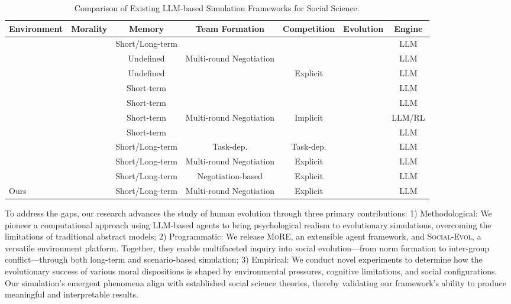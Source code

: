 \documentclass[letterpaper]{article} %
\newcommand{\cmark}{\ding{51}}  %
\newcommand{\xmark}{\ding{55}}  %
\newcommand{\agentframe}{\textsc{MoRE}\xspace}
\newcommand{\envframe}{\textsc{Social-Evol}\xspace}
\begin{document}
\begin{table}[t]
\setlength{\tabcolsep}{3pt}
\centering
\caption{Comparison of Existing LLM-based Simulation Frameworks for Social Science.}
\begin{tabularx}{\textwidth}{@{}p{4.5cm} c c c c c c@{}}
\toprule
\textbf{Environment} & \textbf{Morality} & \textbf{Memory} & \textbf{Team Formation} & \textbf{Competition} & \textbf{Evolution} & \textbf{Engine} \\
\midrule
\citet{park2023generative} & \xmark & Short/Long-term &  \xmark & \xmark & \xmark & LLM \\
\citet{li2023camel} & \xmark & Undefined & Multi-round Negotiation & \xmark & \xmark & LLM \\
\citet{horton2023large} & \xmark & Undefined & \xmark & Explicit & \xmark & LLM \\
\citet{aher2023using} & \xmark & Short-term & \xmark & \xmark & \xmark & LLM \\
\citet{wang2023humanoid} & \xmark & Short-term & \xmark & \xmark & \xmark & LLM \\
\citet{huang2024adasociety} & \xmark & Short-term & Multi-round Negotiation & Implicit & \cmark & LLM/RL \\
\citet{wang2024simulating} & \xmark & Short-term & \xmark & \xmark & \xmark & LLM \\
\citet{piao2025agentsociety} & \xmark &  Short/Long-term & Task-dep. & Task-dep. & \cmark & LLM \\
\citet{guan2024richelieu} & \xmark & Short/Long-term & Multi-round Negotiation & Explicit & \cmark & LLM \\
\citet{dai2024artificial} & \xmark & Short/Long-term & Negotiation-based & Explicit & \cmark & LLM \\
\midrule
Ours & \cmark & Short/Long-term & Multi-round Negotiation & Explicit & \cmark & LLM \\
\bottomrule
\end{tabularx}
\label{tab:comparison}
\end{table}

To address the gaps, our research advances the study of human evolution through three primary contributions:
1) Methodological: We pioneer a computational approach using LLM-based agents to bring psychological realism to evolutionary simulations, overcoming the limitations of traditional abstract models;
2) Programmatic: We release \agentframe, an extensible agent framework, and \envframe, a versatile environment platform. Together, they enable multifaceted inquiry into social evolution—from norm formation to inter-group conflict—through both long-term and scenario-based simulation;
3) Empirical: We conduct novel experiments to determine how the evolutionary success of various moral dispositions is shaped by environmental pressures, cognitive limitations, and social configurations. Our simulation's emergent phenomena align with established social science theories, thereby validating our framework's ability to produce meaningful and interpretable results.
\end{document}
